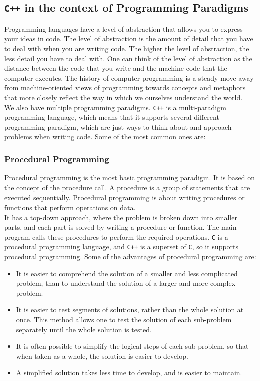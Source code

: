\subsection{\texttt{C++} in the context of Programming Paradigms}

Programming languages have a level of abstraction that allows you to express your ideas in code.
The level of abstraction is the amount of detail that you have to deal with when you are writing code.
The higher the level of abstraction, the less detail you have to deal with. One can think of the level of
abstraction as the distance between the code that you write and the machine code that the computer executes.
The history of computer programming is a steady move away from machine-oriented views of programming towards 
concepts and metaphors that more closely reflect the way in which we ourselves understand the world.\\

We also have multiple programming paradigms. \texttt{C++} is a multi-paradigm programming language, 
which means that it supports several different programming paradigm, which are just ways to think 
about and approach problems when writing code. Some of the most common ones are:

\subsubsection{Procedural Programming}

Procedural programming is the most basic programming paradigm. It is based on the concept of the procedure call.
A procedure is a group of statements that are executed sequentially. Procedural programming is about writing
procedures or functions that perform operations on data.\\

It has a top-down approach, where the problem is broken down into smaller parts, and each part is solved
by writing a procedure or function. The main program calls these procedures to perform the required operations. 
\texttt{C} is a procedural programming language, and \texttt{C++} is a superset of \texttt{C}, so it supports
procedural programming. Some of the advantages of procedural programming are:

\begin{itemize}
    \item It is easier to comprehend the solution of a smaller and less complicated problem, than to understand
    the solution of a larger and more complex problem.
    \item It is easier to test segments of solutions, rather than the whole solution at once. This method 
    allows one to test the solution of each sub-problem separately until the whole solution is tested.
    \item It is often possible to simplify the logical steps of each sub-problem, so that when taken as a whole, 
    the solution is easier to develop.
    \item A simplified solution takes less time to develop, and is easier to maintain.
\end{itemize}

